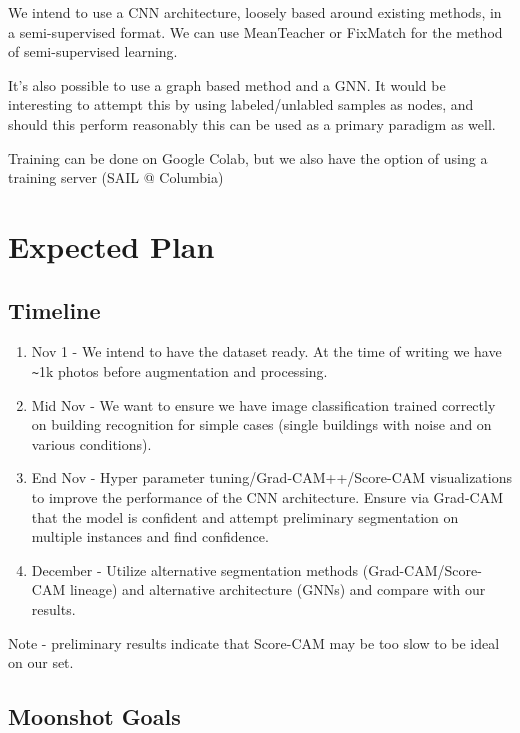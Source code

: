 \documentclass{article}
\begin{document}
We intend to use a CNN architecture, loosely based around existing methods, in a semi-supervised format. We can use MeanTeacher or FixMatch for the method of semi-supervised learning.

It's also possible to use a graph based method and a GNN. It would be interesting to attempt this by using labeled/unlabled samples as nodes, and should this perform reasonably this can be used as a primary paradigm as well.

Training can be done on Google Colab, but we also have the option of using a training server (SAIL @ Columbia)

\section{Expected Plan}
\label{plan}

\subsection{Timeline}

\begin{enumerate}
    \item Nov 1 - We intend to have the dataset ready. At the time of writing we have \verb|~|1k photos before augmentation and processing.
    \item Mid Nov - We want to ensure we have image classification trained correctly on building recognition for simple cases (single buildings with noise and on various conditions). 
    \item End Nov - Hyper parameter tuning/Grad-CAM++/Score-CAM visualizations to improve the performance of the CNN architecture. Ensure via Grad-CAM that the model is confident and attempt preliminary segmentation on multiple instances and find confidence.
    \item December - Utilize alternative segmentation methods (Grad-CAM/Score-CAM lineage) and alternative architecture (GNNs) and compare with our results.
\end{enumerate}

Note - preliminary results indicate that Score-CAM may be too slow to be ideal on our set.


\subsection{Moonshot Goals}

\end{document}
